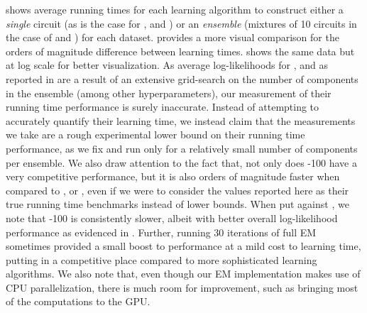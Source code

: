  shows average running times for each learning algorithm to construct either a
\emph{single} circuit (as is the case for ,  and
) or an \emph{ensemble} (mixtures of 10 circuits in the case of
 and ) for each dataset.  provides a more
visual comparison for the orders of magnitude difference between learning times. 
shows the same data but at log scale for better visualization. As average log-likelihoods for
,  and  as reported in  are a
result of an extensive grid-search on the number of components in the ensemble (among other
hyperparameters), our measurement of their running time performance is surely inaccurate. Instead
of attempting to accurately quantify their learning time, we instead claim that the measurements we
take are a rough experimental lower bound on their running time performance, as we fix and run only
for a relatively small number of components per ensemble. We also draw attention to the fact that,
not only does -100 have a very competitive performance, but it is also orders of
magnitude faster when compared to ,  or ,
even if we were to consider the values reported here as their true running time benchmarks instead
of lower bounds. When put against , we note that -100 is
consistently slower, albeit with better overall log-likelihood performance as evidenced in
. Further, running 30 iterations of full EM sometimes provided a small boost to
performance at a mild cost to learning time, putting  in a competitive place
compared to more sophisticated learning algorithms. We also note that, even though our EM
implementation makes use of CPU parallelization, there is much room for improvement, such as
bringing most of the computations to the GPU.


